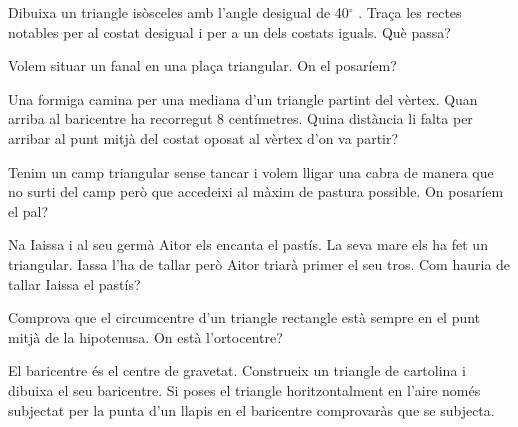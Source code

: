 \begin{mylist}
 
	\exer  Dibuixa un triangle isòsceles amb l'angle desigual de 40${}^\circ$ . Traça les rectes notables per al costat desigual i per a un dels costats iguals. Què passa?
	
	
	\exer  Volem situar un fanal en una plaça triangular. On el posaríem?
	
	
	\exer  Una formiga camina per una mediana d'un triangle partint del vèrtex. Quan arriba al baricentre ha recorregut 8 centímetres. Quina distància li falta per arribar al punt mitjà del costat oposat al vèrtex d'on va partir?
	
	
	\exer  Tenim un camp triangular sense tancar i volem lligar una cabra de manera que no surti del camp però que accedeixi al màxim de pastura possible. On posaríem el pal?
	
	
	\exer  Na Iaissa i al seu germà Aitor els encanta el pastís. La seva mare els ha fet un triangular. Iassa l'ha de tallar però Aitor triarà primer el seu tros. Com hauria de tallar Iaissa el pastís?
	
	
	\exer  Comprova que el circumcentre d'un triangle rectangle està sempre en el punt mitjà de la hipotenusa. On està l'ortocentre?
	
	
	\exer  El baricentre és el centre de gravetat. Construeix un triangle de cartolina i dibuixa el seu baricentre. Si poses el triangle horitzontalment en l'aire només subjectat per la punta d'un llapis en el baricentre comprovaràs que se subjecta. 
	

\end{mylist}
